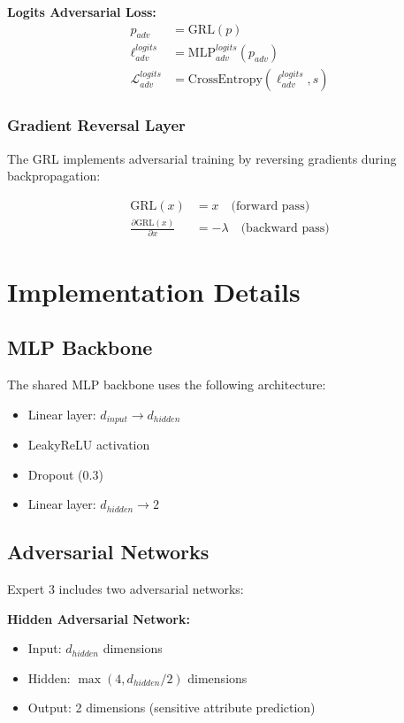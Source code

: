 \documentclass[11pt]{article}
\begin{document}
\textbf{Logits Adversarial Loss:}
\begin{align}
    p_{adv} &= \text{GRL}(p) \\
    \ell_{adv}^{logits} &= \text{MLP}_{adv}^{logits}(p_{adv}) \\
    \mathcal{L}_{adv}^{logits} &= \text{CrossEntropy}(\ell_{adv}^{logits}, s)
\end{align}

\subsubsection{Gradient Reversal Layer}
The GRL implements adversarial training by reversing gradients during backpropagation:

\begin{align}
    \text{GRL}(x) &= x \quad \text{(forward pass)} \\
    \frac{\partial \text{GRL}(x)}{\partial x} &= -\lambda \quad \text{(backward pass)}
\end{align}

\section{Implementation Details}

\subsection{MLP Backbone}
The shared MLP backbone uses the following architecture:
\begin{itemize}
    \item Linear layer: $d_{input} \rightarrow d_{hidden}$
    \item LeakyReLU activation
    \item Dropout (0.3)
    \item Linear layer: $d_{hidden} \rightarrow 2$
\end{itemize}

\subsection{Adversarial Networks}
Expert 3 includes two adversarial networks:

\textbf{Hidden Adversarial Network:}
\begin{itemize}
    \item Input: $d_{hidden}$ dimensions
    \item Hidden: $\max(4, d_{hidden}/2)$ dimensions
    \item Output: 2 dimensions (sensitive attribute prediction)
\end{itemize}
\end{document}
